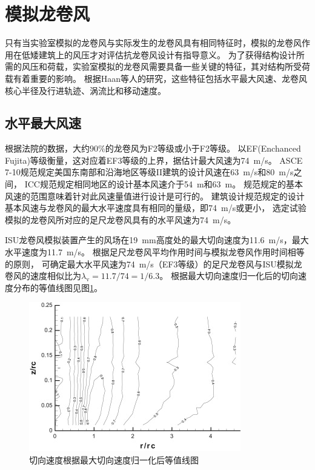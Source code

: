 \documentclass{ctexart}
\begin{document}
\section{模拟龙卷风}
只有当实验室模拟的龙卷风与实际发生的龙卷风具有相同特征时，模拟的龙卷风作用在低矮建筑上的风压才对评估抗龙卷风设计有指导意义。
为了获得结构设计所需的风压和荷载，实验室模拟的龙卷风需要具备一些关键的特征，其对结构所受荷载有着重要的影响。
根据Haan等人的研究，这些特征包括水平最大风速、龙卷风核心半径及行进轨迹、涡流比和移动速度。

\subsection{水平最大风速}
根据法院的数据，大约$90 \%$的龙卷风为F2等级或小于F2等级。
以EF(Enchanced Fujita)等级衡量，这对应着EF3等级的上界，据估计最大风速为\SI{74}{m/s}。
ASCE 7-10规范规定美国东南部和沿海地区等级II建筑的设计风速在\SI{63}{m/s}和\SI{80}{m/s}之间，
ICC规范规定相同地区的设计基本风速介于\SI{54}{m}和\SI{63}{m}。
规范规定的基本风速的范围意味着针对此风速量值进行设计是可行的。
建筑设计规范规定的设计基本风速与龙卷风的最大水平速度具有相同的量级，即\SI{74}{m/s}或更小，
选定试验模拟的龙卷风所对应的足尺龙卷风具有的水平风速为\SI{74}{m/s}。

ISU龙卷风模拟装置产生的风场在\SI{19}{mm}高度处的最大切向速度为\SI{11.6}{m/s}，最大水平速度为\SI{11.7}{m/s}。
根据足尺龙卷风平均作用时间与模拟龙卷风作用时间相等的原则，
可确定最大水平风速为\SI{74}{m/s}（EF3等级）的足尺龙卷风与ISU模拟龙卷风的速度相似比为$\lambda_{\mathrm{v}}=11.7/74=1/6.3$。
根据最大切向速度归一化后的切向速度分布的等值线图见图\ref{fig:Vt-contour}。 

\begin{figure}
\centering
\includegraphics{./fig/1.jpg}
\caption{切向速度根据最大切向速度归一化后等值线图}
\label{fig:Vt-contour}
\end{figure}
\end{document}
